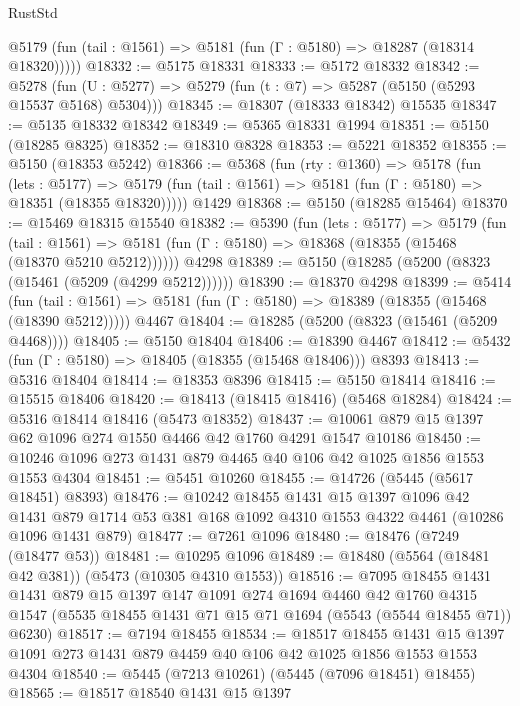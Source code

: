 \begin{lexlean}{RustStd}
\begin{coremodule}
      @5179 (fun (tail : @1561) => @5181 (fun (Γ : @5180) => @18287 (@18314 @18320)))))
@18332 := @5175 @18331
@18333 := @5172 @18332
@18342 := @5278
    (fun (U : @5277) => @5279 (fun (t : @7) => @5287 (@5150 (@5293 @15537 @5168) @5304)))
@18345 := @18307 (@18333 @18342) @15535
@18347 := @5135 @18332 @18342
@18349 := @5365 @18331 @1994
@18351 := @5150 (@18285 @8325)
@18352 := @18310 @8328
@18353 := @5221 @18352
@18355 := @5150 (@18353 @5242)
@18366 := @5368
    (fun (rty : @1360) =>
    @5178
      (fun (lets : @5177) =>
      @5179 (fun (tail : @1561) => @5181 (fun (Γ : @5180) => @18351 (@18355 @18320)))))
    @1429
@18368 := @5150 (@18285 @15464)
@18370 := @15469 @18315 @15540
@18382 := @5390
    (fun (lets : @5177) =>
    @5179
      (fun (tail : @1561) =>
      @5181 (fun (Γ : @5180) => @18368 (@18355 (@15468 (@18370 @5210 @5212))))))
    @4298
@18389 := @5150 (@18285 (@5200 (@8323 (@15461 (@5209 (@4299 @5212))))))
@18390 := @18370 @4298
@18399 := @5414
    (fun (tail : @1561) => @5181 (fun (Γ : @5180) => @18389 (@18355 (@15468 (@18390 @5212)))))
    @4467
@18404 := @18285 (@5200 (@8323 (@15461 (@5209 @4468))))
@18405 := @5150 @18404
@18406 := @18390 @4467
@18412 := @5432 (fun (Γ : @5180) => @18405 (@18355 (@15468 @18406))) @8393
@18413 := @5316 @18404
@18414 := @18353 @8396
@18415 := @5150 @18414
@18416 := @15515 @18406
@18420 := @18413 (@18415 @18416) (@5468 @18284)
@18424 := @5316 @18414 @18416 (@5473 @18352)
@18437 := @10061 @879 @15 @1397 @62 @1096 @274 @1550 @4466 @42 @1760 @4291 @1547 @10186
@18450 := @10246 @1096 @273 @1431 @879 @4465 @40 @106 @42 @1025 @1856 @1553 @1553 @4304
@18451 := @5451 @10260
@18455 := @14726 (@5445 (@5617 @18451) @8393)
@18476 := @10242
    @18455
    @1431
    @15
    @1397
    @1096
    @42
    @1431
    @879
    @1714
    @53
    @381
    @168
    @1092
    @4310
    @1553
    @4322
    @4461
    (@10286 @1096 @1431 @879)
@18477 := @7261 @1096
@18480 := @18476 (@7249 (@18477 @53))
@18481 := @10295 @1096
@18489 := @18480 (@5564 (@18481 @42 @381)) (@5473 (@10305 @4310 @1553))
@18516 := @7095
    @18455
    @1431
    @1431
    @879
    @15
    @1397
    @147
    @1091
    @274
    @1694
    @4460
    @42
    @1760
    @4315
    @1547
    (@5535 @18455 @1431 @71 @15 @71 @1694 (@5543 (@5544 @18455 @71)) @6230)
@18517 := @7194 @18455
@18534 := @18517
    @18455
    @1431
    @15
    @1397
    @1091
    @273
    @1431
    @879
    @4459
    @40
    @106
    @42
    @1025
    @1856
    @1553
    @1553
    @4304
@18540 := @5445 (@7213 @10261) (@5445 (@7096 @18451) @18455)
@18565 := @18517
    @18540
    @1431
    @15
    @1397

\end{coremodule}
\end{lexlean}
